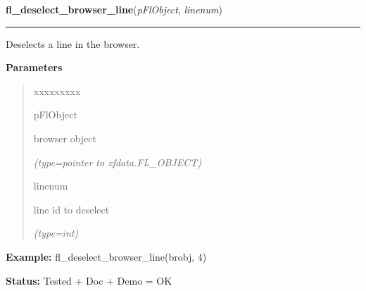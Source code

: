 \hspace{.8\funcindent}\begin{boxedminipage}{\funcwidth}

    \raggedright \textbf{fl\_deselect\_browser\_line}(\textit{pFlObject}, \textit{linenum})

    \vspace{-1.5ex}

    \rule{\textwidth}{0.5\fboxrule}
\setlength{\parskip}{2ex}
    Deselects a line in the browser.

\setlength{\parskip}{1ex}
      \textbf{Parameters}
      \vspace{-1ex}

      \begin{quote}
        \begin{Ventry}{xxxxxxxxx}

          \item[pFlObject]

          browser object

            {\it (type=pointer to xfdata.FL\_OBJECT)}

          \item[linenum]

          line id to deselect

            {\it (type=int)}

        \end{Ventry}

      \end{quote}

\textbf{Example:} fl\_deselect\_browser\_line(brobj, 4)



\textbf{Status:} Tested + Doc + Demo = OK



    \end{boxedminipage}

    \label{xformslib:flbrowser:fl_deselect_browser}

    \vspace{0.5ex}


